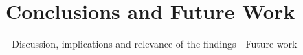 \chapter{Conclusions and Future Work}\label{ch:conclusions}

- Discussion, implications and relevance of the findings
- Future work